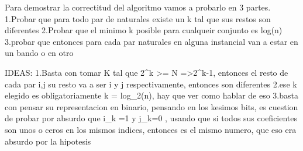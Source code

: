 Para demostrar la correctitud del algoritmo vamos a probarlo en 3 partes.
1.Probar que para todo par de naturales existe un k tal que sus restos son diferentes
2.Probar que el minimo k posible para cualqueir conjunto es log(n) 
3.probar que entonces para cada par naturales en alguna instancial van a estar en un bando o en otro 

IDEAS:
1.Basta con tomar K tal que 2^k >= N =>2^{k-1}, entonces el resto de cada par i,j \in [1,_,N] su resto va a ser i y j respectivamente, entonces son diferentes
2.ese k elegido es obligatoriamente k = log_2(n), hay que ver como hablar de eso
3.basta con pensar su representacion en binario, pensando en los kesimos bits, es cuestion de probar por absurdo que  i_k =1 y j_k=0 , usando que si todos sus coeficientes son unos o ceros en los mismos indices, entonces es el mismo numero, que eso era absurdo por la hipotesis